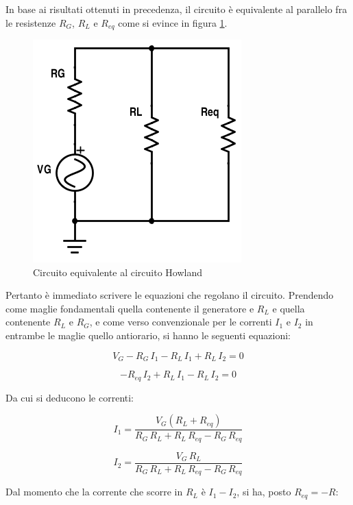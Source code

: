 \documentclass[journal, a4paper]{IEEEtran}
\begin{document}
In base ai risultati ottenuti in precedenza, il circuito è equivalente al parallelo fra le resistenze $R_G$, $R_L$ e $R_{eq}$ come si evince in figura \ref{fig:equiv}.

\begin{figure}[htp]
\centering
\includegraphics[scale=.4]{equivalent}
\caption{Circuito equivalente al circuito Howland}
\label{fig:equiv}
\end{figure}

Pertanto è immediato scrivere le equazioni che regolano il circuito. Prendendo come maglie fondamentali quella contenente il generatore e $R_L$ e quella contenente $R_L$ e $R_G$, e come verso convenzionale per le correnti $I_1$ e $I_2$ in entrambe le maglie quello antiorario, si hanno le seguenti equazioni:

\begin{equation}
V_G-R_G\,I_1-R_L\,I_1+R_L\,I_2 = 0
\end{equation}

\begin{equation}
-R_{eq}\,I_2+R_L\,I_1-R_L\,I_2 = 0
\end{equation}

Da cui si deducono le correnti:

\begin{equation}
I_1 = \frac{V_G(R_L + R_{eq})}{R_G\,R_L +R_L\,R_{eq} - R_G\,R_{eq}}
\end{equation}

\begin{equation}
I_2 = \frac{V_G\,R_L}{R_G\,R_L +R_L\,R_{eq} - R_G\,R_{eq}}
\end{equation}

Dal momento che la corrente che scorre in $R_L$ è $I_1 - I_2$, si ha, posto $R_{eq} = -R$:
\end{document}
